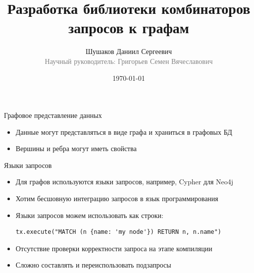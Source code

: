 \documentclass[aspectratio=169]{beamer}
\begin{document}
\title[Комбинаторы запросов к графам]
{
  Разработка библиотеки комбинаторов запросов к графам
}
\author[Шушаков Д.С.]
{
Шушаков Даниил Сергеевич\\
{\footnotesize\textcolor{gray}{Научный руководитель: Григорьев Семен Вячеславович}}\\
}
\date{\today}

\frame{\titlepage}

\setlength{\parskip}{0.25cm}

\begin{frame}{Графовое представление данных}
  \begin{itemize}
    \item Данные могут представляться в виде графа и храниться в графовых БД
    \item Вершины и ребра могут иметь свойства
  \end{itemize}

\end{frame}



\begin{frame}[fragile]{Языки запросов}
  \begin{itemize}
    \item Для графов используются языки запросов, например, Cypher для Neo4j
    \item Хотим бесшовную интеграцию запросов в язык программирования
    \item Языки запросов можем использовать как строки:
          \begin{verbatim}
tx.execute("MATCH (n {name: 'my node'}) RETURN n, n.name")
\end{verbatim}

    \item Отсутствие проверки корректности запроса на этапе компиляции
    \item Сложно составлять и переиспользовать подзапросы
  \end{itemize}

\end{frame}
\end{document}
